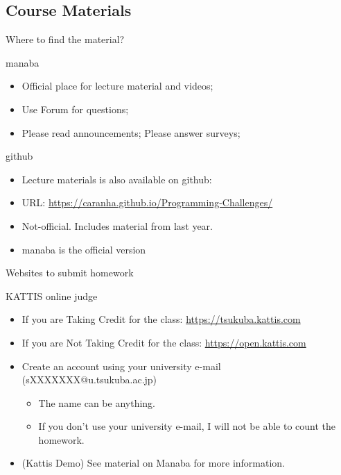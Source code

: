 \subsection{Course Materials}
\begin{frame}{Where to find the material?}
  \begin{block}{manaba}
    \begin{itemize}
      \item Official place for lecture material and videos;
      \item Use Forum for questions;
      \item Please read announcements; Please answer surveys;
    \end{itemize}
  \end{block}
  \begin{block}{github}
    \begin{itemize}
      \item Lecture materials is also available on github:
      \item URL: \url{https://caranha.github.io/Programming-Challenges/}
      \item Not-official. Includes material from last year.
      \item manaba is the official version
    \end{itemize}
  \end{block}
\end{frame}

\begin{frame}{Websites to submit homework}
  \begin{block}{KATTIS online judge}
    \begin{itemize}
      \item If you are \alert{Taking Credit} for the class: \url{https://tsukuba.kattis.com}
      \item If you are \alert{Not Taking Credit} for the class: \url{https://open.kattis.com}
        \medskip
        
      \item Create an account using your university e-mail (sXXXXXXX@u.tsukuba.ac.jp)
        \begin{itemize}
        \item The name can be anything.
        \item If you don't use your university e-mail, I will not be able to count the homework.
        \end{itemize}\medskip
        
      \item (Kattis Demo) See material on Manaba for more information.
    \end{itemize}
  \end{block}
\end{frame}

